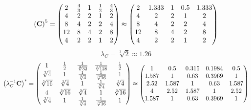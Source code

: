 \documentclass[10pt,a4paper]{article}
\begin{document}
	\[
		\left(\bold{C}\right)^{5} = 
		\begin{pmatrix}
			{{2}} {} & \frac{{4}} {{3}} & {1} {} & \frac{1} {{2}} & \frac{{4}} {{3}} \\
			{{4}} {} & {{2}} {} & {{2}} {} & {1} {} & {{2}} {} \\
			{{8}} {} & {{4}} {} & {{2}} {} & {{2}} {} & {{4}} {} \\
			{{12}} {} & {{8}} {} & {{4}} {} & {{2}} {} & {{8}} {} \\
			{{4}} {} & {{2}} {} & {{2}} {} & {1} {} & {{2}} {} \\
		\end{pmatrix}
		\approx
		\begin{pmatrix}
			2        & 1.333    & 1        & 0.5      & 1.333    \\
			4        & 2        & 2        & 1        & 2        \\
			8        & 4        & 2        & 2        & 4        \\
			12       & 8        & 4        & 2        & 8        \\
			4        & 2        & 2        & 1        & 2        \\
		\end{pmatrix}
	\]
	\[
		\lambda_{C} = {\sqrt[3]{2}} {}\approx 1.26
	\]
	\[
		\left(\lambda_{C}^{-1}\bold{C}\right)^* = 
		\begin{pmatrix}
			{1} {} & \frac{1} {{2}} & \frac{1} {\sqrt[3]{32}} & \frac{1} {\sqrt[3]{128}} & \frac{1} {{2}} \\
			{\sqrt[3]{4}} {} & {1} {} & \frac{1} {\sqrt[3]{4}} & \frac{1} {\sqrt[3]{16}} & {1} {} \\
			{\sqrt[3]{16}} {} & {\sqrt[3]{4}} {} & {1} {} & \frac{1} {\sqrt[3]{4}} & {\sqrt[3]{4}} {} \\
			{{4}} {} & {\sqrt[3]{16}} {} & {\sqrt[3]{4}} {} & {1} {} & {\sqrt[3]{16}} {} \\
			{\sqrt[3]{4}} {} & {1} {} & \frac{1} {\sqrt[3]{4}} & \frac{1} {\sqrt[3]{16}} & {1} {} \\
		\end{pmatrix}
		\approx
		\begin{pmatrix}
			1        & 0.5      & 0.315    & 0.1984   & 0.5      \\
			1.587    & 1        & 0.63     & 0.3969   & 1        \\
			2.52     & 1.587    & 1        & 0.63     & 1.587    \\
			4        & 2.52     & 1.587    & 1        & 2.52     \\
			1.587    & 1        & 0.63     & 0.3969   & 1        \\
		\end{pmatrix}
	\]
\end{document}
